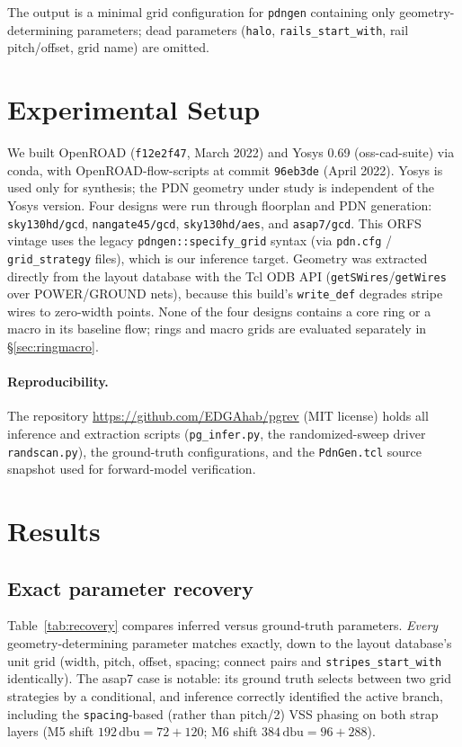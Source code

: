 \documentclass[11pt]{article}
\begin{document}
The output is a minimal grid configuration for \texttt{pdngen}
containing only geometry-determining parameters; dead parameters
(\texttt{halo}, \texttt{rails\_start\_with}, rail pitch/offset, grid name)
are omitted.

\section{Experimental Setup}

We built OpenROAD (\texttt{f12e2f47}, March 2022) and Yosys 0.69
(oss-cad-suite) via conda, with OpenROAD-flow-scripts at commit
\texttt{96eb3de} (April 2022).  Yosys is used only for synthesis; the PDN
geometry under study is independent of the Yosys version.  Four designs were run through floorplan and PDN generation:
\texttt{sky130hd/gcd}, \texttt{nangate45/gcd}, \texttt{sky130hd/aes},
and \texttt{asap7/gcd}.  This ORFS vintage uses the legacy
\texttt{pdngen::specify\_grid} syntax (via \texttt{pdn.cfg} /
\texttt{grid\_strategy} files), which is our inference target.
Geometry was extracted directly from the layout database with the Tcl ODB
API (\texttt{getSWires}/\texttt{getWires} over POWER/GROUND nets),
because this build's \texttt{write\_def} degrades stripe wires to
zero-width points.  None of the four designs contains a core ring or a
macro in its baseline flow; rings and macro grids are evaluated
separately in \S\ref{sec:ringmacro}.

\paragraph{Reproducibility.} The repository
\url{https://github.com/EDGAhab/pgrev} (MIT license) holds all inference
and extraction scripts (\texttt{pg\_infer.py}, the randomized-sweep
driver \texttt{randscan.py}), the ground-truth configurations, and the
\texttt{PdnGen.tcl} source snapshot used for forward-model verification.

\section{Results}

\subsection{Exact parameter recovery}

Table~\ref{tab:recovery} compares inferred versus ground-truth
parameters.  \emph{Every} geometry-determining parameter matches exactly,
down to the layout database's unit grid (width, pitch, offset, spacing;
connect pairs and \texttt{stripes\_start\_with} identically).  The asap7 case is notable:
its ground truth selects between two grid strategies by a conditional, and
inference correctly identified the active branch, including the
\texttt{spacing}-based (rather than pitch/2) VSS phasing on both strap
layers (M5 shift $192\,\mathrm{dbu} = 72 + 120$; M6 shift
$384\,\mathrm{dbu} = 96 + 288$).
\end{document}
